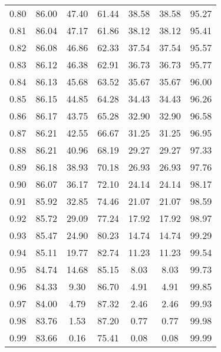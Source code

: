 \begin{tabular}{|c|c|c|c|c|c|c|}
      0.80 &     86.00 &     47.40 &      61.44 &   38.58 &      38.58 &         95.27 \\
      0.81 &     86.04 &     47.17 &      61.86 &   38.12 &      38.12 &         95.41 \\
      0.82 &     86.08 &     46.86 &      62.33 &   37.54 &      37.54 &         95.57 \\
      0.83 &     86.12 &     46.38 &      62.91 &   36.73 &      36.73 &         95.77 \\
      0.84 &     86.13 &     45.68 &      63.52 &   35.67 &      35.67 &         96.00 \\
      0.85 &     86.15 &     44.85 &      64.28 &   34.43 &      34.43 &         96.26 \\
      0.86 &     86.17 &     43.75 &      65.28 &   32.90 &      32.90 &         96.58 \\
      0.87 &     86.21 &     42.55 &      66.67 &   31.25 &      31.25 &         96.95 \\
      0.88 &     86.21 &     40.96 &      68.19 &   29.27 &      29.27 &         97.33 \\
      0.89 &     86.18 &     38.93 &      70.18 &   26.93 &      26.93 &         97.76 \\
      0.90 &     86.07 &     36.17 &      72.10 &   24.14 &      24.14 &         98.17 \\
      0.91 &     85.92 &     32.85 &      74.46 &   21.07 &      21.07 &         98.59 \\
      0.92 &     85.72 &     29.09 &      77.24 &   17.92 &      17.92 &         98.97 \\
      0.93 &     85.47 &     24.90 &      80.23 &   14.74 &      14.74 &         99.29 \\
      0.94 &     85.11 &     19.77 &      82.74 &   11.23 &      11.23 &         99.54 \\
      0.95 &     84.74 &     14.68 &      85.15 &    8.03 &       8.03 &         99.73 \\
      0.96 &     84.33 &      9.30 &      86.70 &    4.91 &       4.91 &         99.85 \\
      0.97 &     84.00 &      4.79 &      87.32 &    2.46 &       2.46 &         99.93 \\
      0.98 &     83.76 &      1.53 &      87.20 &    0.77 &       0.77 &         99.98 \\
      0.99 &     83.66 &      0.16 &      75.41 &    0.08 &       0.08 &         99.99 \\
\bottomrule
\end{tabular}
